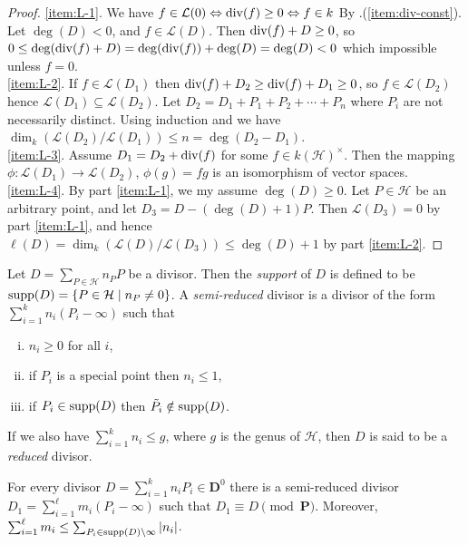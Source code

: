 \begin{proof}
\ref{item:L-1}. We have $f \in \mathcal{L}(0) \Leftrightarrow \operatorname{div}(f) \ge 0 \Leftrightarrow f 
\in k$ By .(\ref{item:div-const}). Let $\deg(D) < 0$, and $f 
\in \mathcal{L}(D)$. Then $\operatorname{div}(f) + D \ge 0$, so $0 \le \deg(\operatorname{div}(f) + D) = 
\deg(\operatorname{div}(f)) + \deg(D) = \deg(D) < 0$ which impossible unless $f = 0$. \\
\ref{item:L-2}. If $f \in \mathcal{L}(D_1)$ then $\operatorname{div}(f) + D_2 \ge \operatorname{div}(f) + D_1 \ge 0$, so 
$f \in \mathcal{L}(D_2)$ hence $\mathcal{L}(D_1) \subseteq \mathcal{L}(D_2)$. Let $D_2 = D_1 + P_1 + 
P_2 + \cdots + P_n$ where $P_i$ are not necessarily distinct. Using induction and 
 we have $\dim_k(\mathcal{L}(D_2) / \mathcal{L}(D_1)) \le n = \deg(D_2 - 
D_1)$. \\
\ref{item:L-3}. Assume $D_1 = D_2 + \operatorname{div}(f)$ for some $f \in k(\mathcal{H})^\times$. Then the 
mapping $\phi: \mathcal{L}(D_1) \rightarrow \mathcal{L}(D_2)$, $\phi(g) = fg$ is an isomorphism of 
vector spaces. \\
\ref{item:L-4}. By part \ref{item:L-1}, we my assume $\deg(D) \ge 0$. Let $P \in \mathcal{H}$ be an 
arbitrary point, and let $D_3 = D - (\deg(D) + 1)P$. Then $\mathcal{L}(D_3) = 0$ by part 
\ref{item:L-1}, and hence $\ell(D) = \dim_k(\mathcal{L}(D) / \mathcal{L}(D_3)) \le \deg(D) + 1$ by 
part \ref{item:L-2}.
\end{proof}
\begin{definition}
Let $D = \sum_{P \in \mathcal{H}} n_PP$ be a divisor. Then the \textit{support} of $D$ is defined to 
be $\operatorname{supp}(D) = \{ P \in \mathcal{H} \mid n_P \ne 0 \}$. A \textit{semi-reduced} divisor is a divisor 
of the form $\sum_{i = 1}^k n_i(P_i - \infty)$ such that 
\begin{enumerate}[(i)]
\item $n_i \ge 0$ for all $i$,
\item if $P_i$ is a special point then $n_i \le 1$,
\item if $P_i \in \operatorname{supp}(D)$ then $\tilde{P_i} \notin \operatorname{supp}(D)$.
\end{enumerate}
If we also have $\sum_{i = 1}^k n_i \le g$, where $g$ is the genus of $\mathcal{H}$, then $D$ is 
said to be a \textit{reduced} divisor.
\end{definition}
\begin{lemma}
\label{lemma:d-eq-semi}
For every divisor $D = \sum_{i = 1}^kn_iP_i \in \mathbf{D}^0$ there is a semi-reduced divisor $D_1 = 
\sum_{i = 1}^\ell m_i(P_i - \infty)$ such that $D_1 \equiv D \pmod {\mathbf{P}}$. Moreover, $\sum_{i 
= 1}^\ell m_i \le \sum_{P_i \in \operatorname{supp}(D)\backslash\infty}\left\vert n_i\right\vert$.
\end{lemma}
